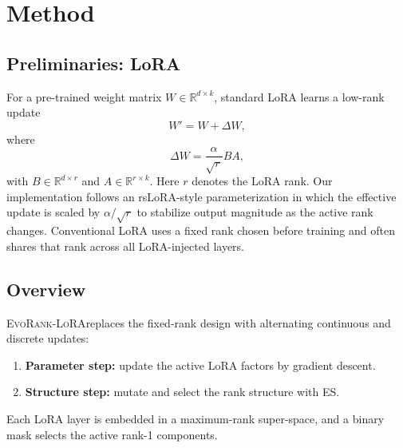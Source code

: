 \documentclass{article}
\newcommand{\method}{\textsc{EvoRank-LoRA}}
\begin{document}
\section{Method}
\label{sec:method}

\subsection{Preliminaries: LoRA}
For a pre-trained weight matrix $W \in \mathbb{R}^{d \times k}$, standard LoRA learns a low-rank update
\begin{equation}
    W' = W + \Delta W,
\end{equation}
where
\begin{equation}
    \Delta W = \frac{\alpha}{\sqrt{r}}BA,
\end{equation}
with $B \in \mathbb{R}^{d \times r}$ and $A \in \mathbb{R}^{r \times k}$. Here $r$ denotes the LoRA rank. Our implementation follows an rsLoRA-style parameterization in which the effective update is scaled by $\alpha/\sqrt{r}$ to stabilize output magnitude as the active rank changes. Conventional LoRA uses a fixed rank chosen before training and often shares that rank across all LoRA-injected layers.

\subsection{Overview}
\method replaces the fixed-rank design with alternating continuous and discrete updates:
\begin{enumerate}[leftmargin=1.2em]
    \item \textbf{Parameter step:} update the active LoRA factors by gradient descent.
    \item \textbf{Structure step:} mutate and select the rank structure with ES.
\end{enumerate}
Each LoRA layer is embedded in a maximum-rank super-space, and a binary mask selects the active rank-1 components.
\end{document}
